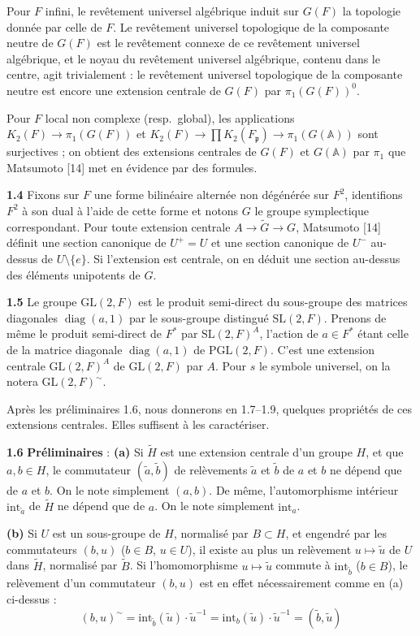 \documentclass[12pt,a4paper]{article}
\theoremstyle{plain}
\theoremstyle{definition}
\theoremstyle{remark}
\DeclareMathOperator{\diag}{diag}
\newcommand{\Af}{\mathbb{A}}
\newcommand{\frakp}{\mathfrak{p}}
\newcommand{\wt}{\widetilde}
\providecommand{\frakp}{\mathfrak{p}}
\begin{document}
Pour $F$ infini, le revêtement universel algébrique induit sur $G(F)$ la topologie donnée par celle de $F$. Le revêtement universel topologique de la composante neutre de $G(F)$ est le revêtement connexe de ce revêtement universel algébrique, et le noyau du revêtement universel algébrique, contenu dans le centre, agit trivialement : le revêtement universel topologique de la composante neutre est encore une extension centrale de $G(F)$ par $\pi_1(G(F))^0$.

Pour $F$ local non complexe (resp.\ global), les applications $K_2(F) \to \pi_1(G(F))$ et $K_2(F) \to \prod K_2(F_\frakp) \to \pi_1(G(\Af))$ sont surjectives ; on obtient des extensions centrales de $G(F)$ et $G(\Af)$ par $\pi_1$ que Matsumoto [14] met en évidence par des formules.

\textbf{1.4} Fixons sur $F$ une forme bilinéaire alternée non dégénérée sur $F^2$, identifions $F^2$ à son dual à l'aide de cette forme et notons $G$ le groupe symplectique correspondant. Pour toute extension centrale $A \to \wt{G} \to G$, Matsumoto [14] définit une section canonique de $U^+ = U$ et une section canonique de $U^-$ au-dessus de $U \setminus \{e\}$. Si l'extension est centrale, on en déduit une section au-dessus des éléments unipotents de $G$.

\textbf{1.5} Le groupe $\mathrm{GL}(2, F)$ est le produit semi-direct du sous-groupe des matrices diagonales $\diag(a, 1)$ par le sous-groupe distingué $\mathrm{SL}(2, F)$. Prenons de même le produit semi-direct de $F^*$ par $\mathrm{SL}(2, F)^A$, l'action de $a \in F^*$ étant celle de la matrice diagonale $\diag(a, 1)$ de $\mathrm{PGL}(2, F)$. C'est une extension centrale $\mathrm{GL}(2, F)^A$ de $\mathrm{GL}(2, F)$ par $A$. Pour $s$ le symbole universel, on la notera $\mathrm{GL}(2, F)^\sim$.

Après les préliminaires 1.6, nous donnerons en 1.7--1.9, quelques propriétés de ces extensions centrales. Elles suffisent à les caractériser.

\textbf{1.6} \textbf{Préliminaires} : \textbf{(a)} Si $\wt{H}$ est une extension centrale d'un groupe $H$, et que $a, b \in H$, le commutateur $(\wt{a}, \wt{b})$ de relèvements $\wt{a}$ et $\wt{b}$ de $a$ et $b$ ne dépend que de $a$ et $b$. On le note simplement $(a, b)$. De même, l'automorphisme intérieur $\mathrm{int}_{\wt{a}}$ de $\wt{H}$ ne dépend que de $a$. On le note simplement $\mathrm{int}_a$.

\textbf{(b)} Si $U$ est un sous-groupe de $H$, normalisé par $B \subset H$, et engendré par les commutateurs $(b, u)$ ($b \in B$, $u \in U$), il existe au plus un relèvement $u \mapsto \wt{u}$ de $U$ dans $\wt{H}$, normalisé par $\wt{B}$. Si l'homomorphisme $u \mapsto \wt{u}$ commute à $\mathrm{int}_{\wt{b}}$ ($b \in B$), le relèvement d'un commutateur $(b, u)$ est en effet nécessairement comme en (a) ci-dessus :
\[
(b, u)^\sim = \mathrm{int}_{\wt{b}}(\wt{u}) \cdot \wt{u}^{-1} = \mathrm{int}_b(\wt{u}) \cdot \wt{u}^{-1} = (\wt{b}, \wt{u})
\]
\end{document}
